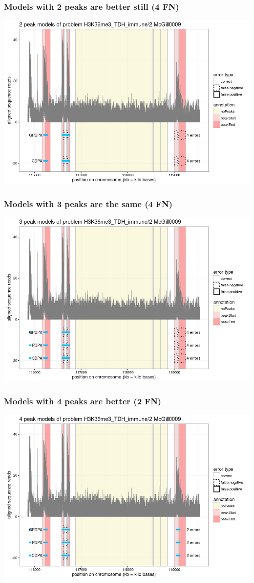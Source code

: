 \documentclass{beamer}
\begin{document}
\begin{frame}
  \frametitle{Models with 2 peaks are better still (4 FN)}
  \includegraphics[width=\textwidth]{figure-min-train-error-problem5-2peaks}
\end{frame}

\begin{frame}
  \frametitle{Models with 3 peaks are the same (4 FN)}
  \includegraphics[width=\textwidth]{figure-min-train-error-problem5-3peaks}
\end{frame}

\begin{frame}
  \frametitle{Models with 4 peaks are better (2 FN)}
  \includegraphics[width=\textwidth]{figure-min-train-error-problem5-4peaks}
\end{frame}
\end{document}
